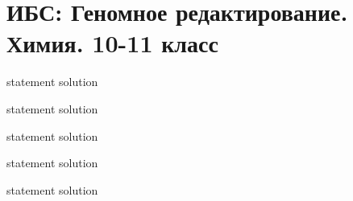 \chapter{ИБС: Геномное редактирование. Химия. 10-11 класс}

{statement}
{solution}

{statement}
{solution}

{statement}
{solution}

{statement}
{solution}

{statement}
{solution}